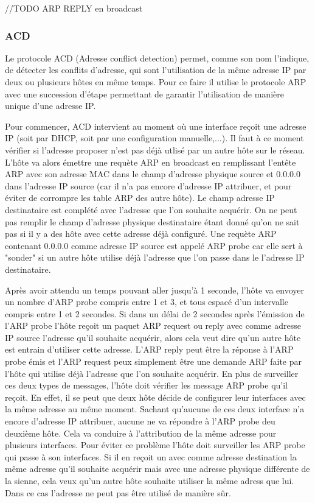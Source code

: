 //TODO ARP REPLY en broadcast

\subsubsection{ACD} Le protocole ACD (Adresse conflict detection) permet, comme
son nom l'indique, de détecter les conflits d'adresse, qui sont l'utilisation
de la même adresse IP par deux ou plusieurs hôtes en même temps.  Pour ce faire
il utilise le protocole ARP avec une succession d'étape permettant de garantir
l'utilisation de manière unique d'une adresse IP.

Pour commencer, ACD intervient au moment où une interface reçoit une adresse IP
(soit par DHCP, soit par une configuration manuelle,...). Il faut à ce moment vérifier si
l'adresse proposer n'est pas déjà utlisé par un autre hôte sur le réseau.
L'hôte va alors émettre une requète ARP en broadcast en remplissant l'entête
ARP avec son adresse MAC dans le champ d'adresse physique source et 0.0.0.0
dans l'adresse IP source (car il n'a pas encore d'adresse IP attribuer, et pour
éviter de corrompre les table ARP des autre hôte). Le champ adresse IP
destinataire est complété avec l'adresse que l'on souhaite acquérir. On ne peut
pas remplir le champ d'adresse physique destinataire étant donné qu'on ne sait
pas si il y a des hôte avec cette adresse déjà configuré.  Une requète ARP
contenant 0.0.0.0 comme adresse IP source est appelé ARP probe car elle sert à
"sonder" si un autre hôte utilise déjà l'adresse que l'on passe dans le
l'adresse IP destinataire.

Après avoir attendu un temps pouvant aller jusqu'à 1 seconde, l'hôte va envoyer
un nombre d'ARP probe compris entre 1 et 3, et tous espacé d'un intervalle
compris entre 1 et 2 secondes.  Si dans un délai de 2 secondes après l'émission
de l'ARP probe l'hôte reçoit un paquet ARP request ou reply avec comme adresse
IP source l'adresse qu'il souhaite acquérir, alors cela veut dire qu'un autre
hôte est entrain d'utiliser cette adresse. L'ARP reply peut être la réponse à
l'ARP probe émis et l'ARP request peux simplement être une demande ARP faite
par l'hôte qui utilise déjà l'adresse que l'on souhaite acquérir.  En plus de
surveiller ces deux types de messages, l'hôte doit vérifier les message ARP
probe qu'il reçoit. En effet, il se peut que deux hôte décide de configurer
leur interfaces avec la même adresse au même moment. Sachant qu'aucune de ces
deux interface n'a encore d'adresse IP attribuer, aucune ne va répondre à l'ARP
probe deu deuxième hôte. Cela va conduire à l'attribution de la même adresse
pour plusieurs interfaces. Pour éviter ce problème l'hôte doit surveiller les
ARP probe qui passe à son interfaces. Si il en reçoit un avec comme adresse
destination la même adresse qu'il souhaite acquérir mais avec une adresse
physique différente de la sienne, cela veux qu'un autre hôte souhaite utiliser
la même adress que lui. Dans ce cas l'adresse ne peut pas être utilisé de manière sûr.

